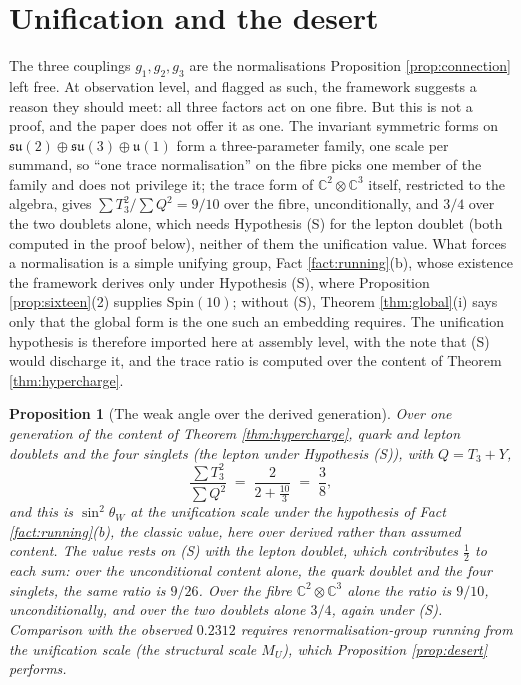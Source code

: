 \documentclass[11pt]{article}
\newtheorem{proposition}[theorem]{Proposition}
\theoremstyle{definition}
\newcommand{\C}{\mathbb{C}}
\newcommand{\su}{\mathfrak{su}}
\newcommand{\uu}{\mathfrak{u}}
\begin{document}
\section{Unification and the desert}\label{sec:running}

The three couplings $g_{1}, g_{2}, g_{3}$ are the normalisations Proposition \ref{prop:connection} left free. At observation level, and flagged as such, the framework suggests a reason they should meet: all three factors act on one fibre. But this is not a proof, and the paper does not offer it as one. The invariant symmetric forms on $\su(2) \oplus \su(3) \oplus \uu(1)$ form a three-parameter family, one scale per summand, so ``one trace normalisation'' on the fibre picks one member of the family and does not privilege it; the trace form of $\C^{2} \otimes \C^{3}$ itself, restricted to the algebra, gives $\sum T_{3}^{2}/\sum Q^{2} = 9/10$ over the fibre, unconditionally, and $3/4$ over the two doublets alone, which needs Hypothesis (S) for the lepton doublet (both computed in the proof below), neither of them the unification value. What forces a normalisation is a simple unifying group, Fact \ref{fact:running}(b), whose existence the framework derives only under Hypothesis (S), where Proposition \ref{prop:sixteen}(2) supplies $\mathrm{Spin}(10)$; without (S), Theorem \ref{thm:global}(i) says only that the global form is the one such an embedding requires. The unification hypothesis is therefore imported here at assembly level, with the note that (S) would discharge it, and the trace ratio is computed over the content of Theorem \ref{thm:hypercharge}.

\begin{proposition}[The weak angle over the derived generation]\label{prop:unification}
Over one generation of the content of Theorem \ref{thm:hypercharge}, quark and lepton doublets and the four singlets (the lepton under Hypothesis (S)), with $Q = T_{3} + Y$,
\begin{equation}\label{eq:angle}
\frac{\sum T_{3}^{2}}{\sum Q^{2}} \;=\; \frac{2}{2 + \tfrac{10}{3}} \;=\; \frac{3}{8},
\end{equation}
and this is $\sin^{2}\theta_{W}$ at the unification scale under the hypothesis of Fact \ref{fact:running}(b), the classic value, here over derived rather than assumed content. The value rests on (S) with the lepton doublet, which contributes $\tfrac12$ to each sum: over the unconditional content alone, the quark doublet and the four singlets, the same ratio is $9/26$. Over the fibre $\C^{2} \otimes \C^{3}$ alone the ratio is $9/10$, unconditionally, and over the two doublets alone $3/4$, again under (S). Comparison with the observed $0.2312$ requires renormalisation-group running from the unification scale (the structural scale $M_{U}$), which Proposition \ref{prop:desert} performs.
\end{proposition}
\end{document}
